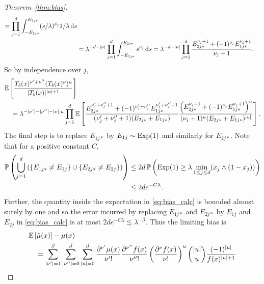\begin{proof}[Theorem~\ref{thm:bias}]
\begin{align*}
    = \prod_{j=1}^d
    \int_{-E_{1j*}}^{E_{2j*}} (s / \lambda)^{\nu_j} 1/\lambda \,\mathrm{d}s \\
    &=
    \lambda^{-d - |\nu|}
    \prod_{j=1}^d
    \int_{-E_{1j*}}^{E_{2j*}} s^{\nu_j} \,\mathrm{d}s
    = \lambda^{-d - |\nu|}
    \prod_{j=1}^d
    \frac{E_{2j*}^{\nu_j + 1} + (-1)^{\nu_j} E_{1j*}^{\nu_j + 1}}
    {\nu_j + 1}.
  \end{align*}
  So by independence over $j$,
  \begin{align}
    \nonumber
    &\mathbb{E} \left[
      \frac{ T_b(x)^{\nu' + \nu''} (T_b(x)^\nu)^u}{|T_b(x)|^{|u|+1}}
    \right] \\
    \label{eq:bias_calc}
    &\quad=
    \lambda^{- |\nu'| - |\nu''| - |\nu| \cdot u}
    \prod_{j=1}^d
    \mathbb{E} \left[
      \frac{E_{2j*}^{\nu'_j + \nu''_j + 1}
      + (-1)^{\nu'_j + \nu''_j} E_{1j*}^{\nu'_j + \nu''_j + 1}}
      {(\nu'_j + \nu''_j + 1) (E_{2j*} + E_{1j*})}
      \frac{\left(E_{2j*}^{\nu_j + 1}
      + (-1)^{\nu_j} E_{1j*}^{\nu_j + 1}\right)^u}
      {(\nu_j + 1)^u (E_{2j*} + E_{1j*})^{|u|}}
    \right].
  \end{align}
  The final step is to replace $E_{1j*}$
  by $E_{1j} \sim \operatorname{Exp}(1)$ and similarly for $E_{2j*}$.
  Note that for a positive constant $C$,
  \begin{align*}
    \mathbb{P} \left(
      \bigcup_{j=1}^{d}
      \left(
        \left\{
          E_{1j*} \neq E_{1j}
        \right\}
        \cup
        \left\{
          E_{2j*} \neq E_{2j}
        \right\}
      \right)
    \right)
    &\leq
    2d\,
    \mathbb{P} \left(
      \operatorname{Exp}(1) \geq \lambda \min_{1 \leq j \leq d}
      (x_j \wedge (1-x_j))
    \right) \\
    &\leq
    2d e^{-C \lambda}.
  \end{align*}
  Further, the quantity inside the expectation in \eqref{eq:bias_calc}
  is bounded almost surely by one and so
  the error incurred by replacing
  $E_{1j*}$ and $E_{2j*}$ by $E_{1j}$ and $E_{2j}$
  in \eqref{eq:bias_calc}
  is at most $2 d e^{-C \lambda} \lesssim \lambda^{-\beta}$.
  Thus the limiting bias is
  \begin{align}
    \nonumber
    &\E \left[ \hat \mu(x) \right]
    - \mu(x) \\
    \nonumber
    &\quad=
    \sum_{|\nu'|=1}^{\flbeta}
    \sum_{|\nu''|=0}^{\flbeta}
    \sum_{|u|=0}^{\flbeta}
    \frac{\partial^{\nu'} \mu(x)}{\nu' !}
    \frac{\partial^{\nu''} f(x)}{\nu'' !}
    \left( \frac{\partial^\nu f(x)}{\nu !} \right)^u
    \binom{|u|}{u}
    \frac{(-1)^{|u|}}{f(x)^{|u|+1}}

\end{align}
\end{proof}

